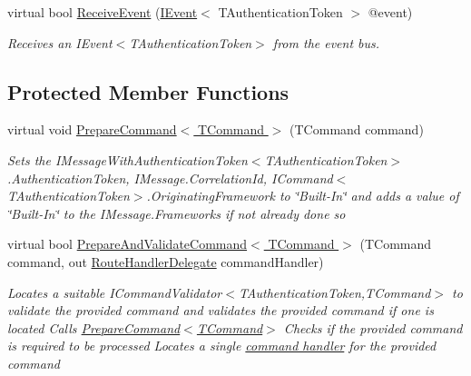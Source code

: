 \begin{DoxyCompactItemize}
virtual bool \hyperlink{classCqrs_1_1Bus_1_1InProcessBus_aab52f8518371f5ff5e3f193b1234f192_aab52f8518371f5ff5e3f193b1234f192}{Receive\+Event} (\hyperlink{interfaceCqrs_1_1Events_1_1IEvent}{I\+Event}$<$ T\+Authentication\+Token $>$ @event)
\begin{DoxyCompactList}\small\item\em Receives an I\+Event$<$\+T\+Authentication\+Token$>$ from the event bus. \end{DoxyCompactList}\end{DoxyCompactItemize}
\subsection*{Protected Member Functions}
\begin{DoxyCompactItemize}
\item 
virtual void \hyperlink{classCqrs_1_1Bus_1_1InProcessBus_ab0064808b1b619bee57fa5eff49bfca7_ab0064808b1b619bee57fa5eff49bfca7}{Prepare\+Command$<$ T\+Command $>$} (T\+Command command)
\begin{DoxyCompactList}\small\item\em Sets the I\+Message\+With\+Authentication\+Token$<$\+T\+Authentication\+Token$>$.\+Authentication\+Token, I\+Message.\+Correlation\+Id, I\+Command$<$\+T\+Authentication\+Token$>$.\+Originating\+Framework to \char`\"{}\+Built-\/\+In\char`\"{} and adds a value of \char`\"{}\+Built-\/\+In\char`\"{} to the I\+Message.\+Frameworks if not already done so \end{DoxyCompactList}\item 
virtual bool \hyperlink{classCqrs_1_1Bus_1_1InProcessBus_a603950d39c407d5b9661dc0937fa67cc_a603950d39c407d5b9661dc0937fa67cc}{Prepare\+And\+Validate\+Command$<$ T\+Command $>$} (T\+Command command, out \hyperlink{classCqrs_1_1Bus_1_1RouteHandlerDelegate}{Route\+Handler\+Delegate} command\+Handler)
\begin{DoxyCompactList}\small\item\em Locates a suitable I\+Command\+Validator$<$\+T\+Authentication\+Token,\+T\+Command$>$ to validate the provided {\itshape command}  and validates the provided {\itshape command}  if one is located Calls \hyperlink{classCqrs_1_1Bus_1_1InProcessBus_ab0064808b1b619bee57fa5eff49bfca7_ab0064808b1b619bee57fa5eff49bfca7}{Prepare\+Command$<$\+T\+Command$>$} Checks if the provided {\itshape command}  is required to be processed Locates a single \hyperlink{classCqrs_1_1Bus_1_1RouteHandlerDelegate}{command handler} for the provided {\itshape command}  \end{DoxyCompactList}\end{DoxyCompactItemize}
